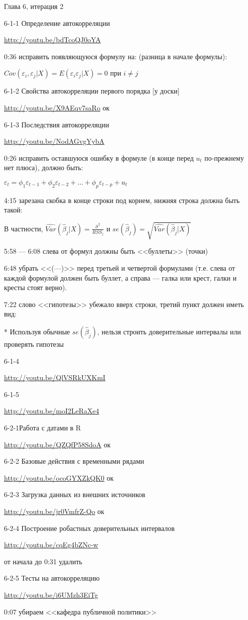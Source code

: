 \documentclass[12pt,a4paper]{article}
\newcommand{\e}{\varepsilon}
\renewcommand{\b}{\beta}
\newcommand{\hb}{\hat{\b}}
\begin{document}
Глава 6, итерация 2

6-1-1 Определение автокорреляции 

\url{http://youtu.be/bdTcoQJ0oYA}

0:36 исправить появляющуюся формулу на: (разница в начале формулы):

$Cov(\e_i,\e_j|X)=E(\e_i \e_j|X)=0$ при $i\neq j$

6-1-2 Свойства автокорреляции первого порядка [у доски]

\url{http://youtu.be/X9AEqv7saRo} ок

6-1-3 Последствия автокорреляции

\url{http://youtu.be/NodAGvgYybA}

0:26 исправить оставшуюся ошибку в формуле (в конце перед $u_t$ по-прежнему нет плюса), должно быть:

$\e_{t}=\phi_1 \e_{t-1}+\phi_2 \e_{t-2} +\ldots + \phi_p \e_{t-p}+u_t$

4:15 зарезана скобка в конце строки под корнем, нижняя строка должна быть такой:

В частности, $\widehat{Var}(\hat{\beta}_j|X)=\frac{\hat{\sigma}^2}{RSS_j}$
и $se(\hat{\beta}_j)=\sqrt{\widehat{Var}(\hat{\beta}_j|X)}$

5:58 --- 6:08 слева от формул должны быть <<буллеты>> (точки)

6:48 убрать <<(---)>> перед третьей и четвертой формулами (т.е. слева от каждой формулой  должен быть буллет, а справа --- галка или крест, галки и кресты стоят верно).

7:22 слово <<гипотезы>> убежало вверх строки, третий пункт должен иметь вид:

* Используя обычные $se(\hb_j)$, нельзя строить доверительные интервалы или проверять гипотезы




6-1-4

\url{http://youtu.be/QlVSRkUXKmI}

6-1-5

\url{http://youtu.be/moI2LeRaXe4}

6-2-1Работа с датами в R

\url{http://youtu.be/QZQfP58SdoA} ок

6-2-2 Базовые действия с временными рядами

\url{http://youtu.be/ocoGYXZkQK0} ок

6-2-3 Загрузка данных из внешних источников

\url{http://youtu.be/jr0VmfrZ-Qo}  ок

6-2-4 Построение робастных доверительных интервалов

\url{http://youtu.be/cqEg4bZNc-w}

от начала до 0:31 удалить

6-2-5 Тесты на автокорреляцию

\url{http://youtu.be/i6UMzh3EiTg}

0:07 убираем <<кафедра публичной политики>>
\end{document}
